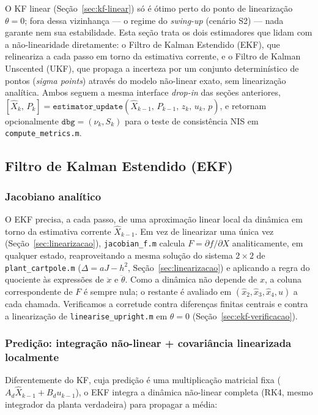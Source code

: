 \documentclass[brazil, 12pt]{article}
\begin{document}
O KF linear (Seção~\ref{sec:kf-linear}) só é ótimo perto do ponto de
linearização $\theta=0$; fora dessa vizinhança --- o regime do
\emph{swing-up} (cenário S2) --- nada garante nem sua estabilidade. Esta
seção trata os dois estimadores que lidam com a não-linearidade diretamente:
o Filtro de Kalman Estendido (EKF), que relineariza a cada passo em torno da
estimativa corrente, e o Filtro de Kalman Unscented (UKF), que propaga a
incerteza por um conjunto determinístico de pontos (\emph{sigma points})
através do modelo não-linear exato, sem linearização analítica. Ambos seguem
a mesma interface \emph{drop-in} das seções anteriores,
$[\hat X_k,\,P_k] = \texttt{estimator\_update}(\hat X_{k-1},\,P_{k-1},\,z_k,\,u_k,\,p)$,
e retornam opcionalmente $\texttt{dbg} = (\nu_k, S_k)$ para o teste de
consistência NIS em \texttt{compute\_metrics.m}.

\subsection{Filtro de Kalman Estendido (EKF)}
\label{sec:ekf}

\subsubsection{Jacobiano analítico}

O EKF precisa, a cada passo, de uma aproximação linear local da dinâmica em
torno da estimativa corrente $\hat X_{k-1}$. Em vez de linearizar uma única
vez (Seção~\ref{sec:linearizacao}), \texttt{jacobian\_f.m} calcula
$F=\partial f/\partial X$ analiticamente, em qualquer estado, reaproveitando a
mesma solução do sistema $2\times2$ de \texttt{plant\_cartpole.m}
($\Delta=aJ-h^2$, Seção~\ref{sec:linearizacao}) e aplicando a regra do
quociente às expressões de $\ddot x$ e $\ddot\theta$. Como a dinâmica não
depende de $x$, a coluna correspondente de $F$ é sempre nula; o restante é
avaliado em $(\hat x_2,\hat x_3,\hat x_4,u)$ a cada chamada. Verificamos a
corretude contra diferenças finitas centrais e contra a linearização de
\texttt{linearise\_upright.m} em $\theta=0$ (Seção~\ref{sec:ekf-verificacao}).

\subsubsection{Predição: integração não-linear + covariância linearizada localmente}

Diferentemente do KF, cuja predição é uma multiplicação matricial fixa
($A_d\hat X_{k-1}+B_d u_{k-1}$), o EKF integra a dinâmica não-linear completa
(RK4, mesmo integrador da planta verdadeira) para propagar a média:
\end{document}
